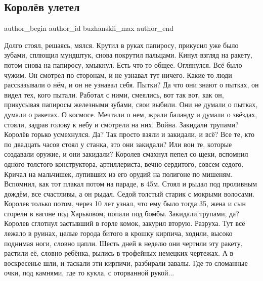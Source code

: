  
 
 
 
 
\subsection{Королёв улетел}
\ifcmt
  author_begin
   author_id buzhanskii_max
  author_end
\fi

\obeycr
Долго стоял, решаясь, мялся.
Крутил в руках папиросу, прикусил уже было зубами, сплющил мундштук, снова покрутил пальцами.
Кинул взгляд на ракету, потом снова на папиросу, хмыкнул.
Есть что то общее.
Оглянулся.
Всё было чужим.
Он смотрел по сторонам, и не узнавал тут ничего.
Какие то люди рассказывали о нём, и он не узнавал себя.
Пытки?
Да что они знают о пытках, он видел тех, кого пытали.
Работал с ними, смеялись, вот так вот, как он, прикусывая папиросы железными зубами, свои выбили.
Они не думали о пытках, думали о ракетах.
О космосе.
Мечтали о нем, жрали баланду и думали о звёздах, стояли, задрав голову к небу и смотрели на них.
Война.
Закидали трупами?
Королёв горько усмехнулся.
Да?
Так просто взяли и закидали, и всё?
Все те, кто по двадцать часов стоял у станка, это они закидали?
Или вон те, которые создавали оружие, и они закидали?
Королев смахнул пепел со щеки, вспомнил одного толстого конструктора, артиллериста, вечно сердитого, совсем седого.
Кричал на мальчишек, лупивших из его орудий на полигоне по мишеням.
Вспомнил, как тот плакал потом на параде, в 45м.
Стоял и рыдал под проливным дождём, все счастливы, а он рыдал.
Седой толстый старик с мокрыми волосами.
Королев только потом, через 10 лет узнал, что ему было тогда 35, жена и сын сгорели в вагоне под Харьковом, попали под бомбы.
Закидали трупами, да?
Королев сглотнул застывший в горле комок, закурил вторую.
Разруха.
Тут всё лежало в руинах, целые города битого в крошку кирпича, ходили, высоко поднимая ноги, словно цапли.
Шесть дней в неделю они чертили эту ракету, растили её, словно ребёнка, рылись в трофейных немецких чертежах.
А в воскресенье шли, и таскали эти кирпичи, разбирали завалы.
Где то сломанные очки, под камнями, где то кукла, с оторванной рукой...

